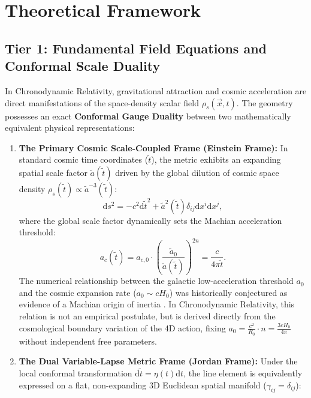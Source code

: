 \documentclass[aps,prd,reprint,superscriptaddress,nofootinbib,floatfix,amsmath,amssymb]{revtex4-2}
\begin{document}
\section{Theoretical Framework}
\label{sec:theory}

\subsection{Tier 1: Fundamental Field Equations and Conformal Scale Duality}
\label{sec:tier1_theory}

In Chronodynamic Relativity, gravitational attraction and cosmic acceleration are direct manifestations of the space-density scalar field $\rho_s(\vec{x}, t)$. The geometry possesses an exact \textbf{Conformal Gauge Duality} between two mathematically equivalent physical representations:
\begin{enumerate}
    \item \textbf{The Primary Cosmic Scale-Coupled Frame (Einstein Frame):} In standard cosmic time coordinates ($\tilde{t}$), the metric exhibits an expanding spatial scale factor $\tilde{a}(\tilde{t})$ driven by the global dilution of cosmic space density $\rho_s(\tilde{t}) \propto \tilde{a}^{-3}(\tilde{t})$:
    \begin{equation}
    \mathrm{d}s^2 = -c^2 \mathrm{d}\tilde{t}^2 + \tilde{a}^2(\tilde{t}) \delta_{ij} \mathrm{d}x^i \mathrm{d}x^j,
    \label{eq:metric_scale}
    \end{equation}
    where the global scale factor dynamically sets the Machian acceleration threshold:
    \begin{equation}
    a_c(\tilde{t}) = a_{c,0} \cdot \left(\frac{\tilde{a}_0}{\tilde{a}(\tilde{t})}\right)^{2n} = \frac{c}{4\pi \tilde{t}}.
    \label{eq:ac_scale}
    \end{equation}
    The numerical relationship between the galactic low-acceleration threshold $a_0$ and the cosmic expansion rate ($a_0 \sim c H_0$) was historically conjectured as evidence of a Machian origin of inertia \cite{Mach1883,Sciama1953,BransDicke1961,Milgrom1983,Milgrom1999}. In Chronodynamic Relativity, this relation is not an empirical postulate, but is derived directly from the cosmological boundary variation of the 4D action, fixing $a_0 = \frac{c^2}{R_0}\cdot n = \frac{3 c H_0}{4\pi}$ without independent free parameters.
    \item \textbf{The Dual Variable-Lapse Metric Frame (Jordan Frame):} Under the local conformal transformation $\mathrm{d}\tilde{t} = \eta(t)\mathrm{d}t$, the line element is equivalently expressed on a flat, non-expanding 3D Euclidean spatial manifold ($\gamma_{ij} = \delta_{ij}$):

\end{enumerate}
\end{document}
